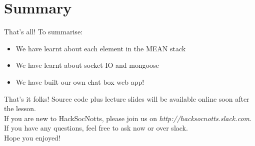 \documentclass{beamer}
\begin{document}
\section{Summary}

\begin{frame}{That's all!}
  To summarise:
  \begin{itemize}
  \item We have learnt about each element in the MEAN stack
  \item We have learnt about socket IO and mongoose
  \item We have built our own chat box web app!
  \end{itemize}
\end{frame}

\begin{frame}{That's it folks!}
Source code plus lecture slides will be available online soon after the lesson.\\
If you are new to HackSocNotts, please join us on \textit{http://hacksocnotts.slack.com}.\\
If you have any questions, feel free to ask now or over slack.\\
Hope you enjoyed!
\end{frame}
\end{document}

